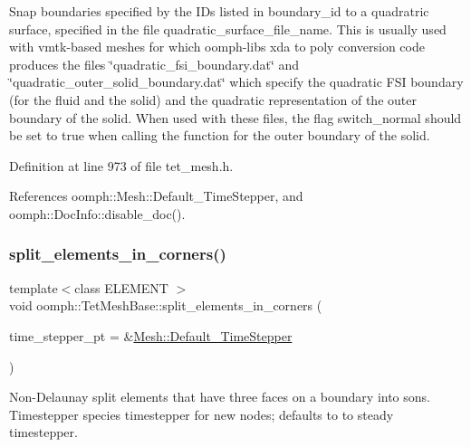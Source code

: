 Snap boundaries specified by the I\+Ds listed in boundary\+\_\+id to a quadratric surface, specified in the file quadratic\+\_\+surface\+\_\+file\+\_\+name. This is usually used with vmtk-\/based meshes for which oomph-\/lib\textquotesingle{}s xda to poly conversion code produces the files \char`\"{}quadratic\+\_\+fsi\+\_\+boundary.\+dat\char`\"{} and \char`\"{}quadratic\+\_\+outer\+\_\+solid\+\_\+boundary.\+dat\char`\"{} which specify the quadratic F\+SI boundary (for the fluid and the solid) and the quadratic representation of the outer boundary of the solid. When used with these files, the flag switch\+\_\+normal should be set to true when calling the function for the outer boundary of the solid. 



Definition at line 973 of file tet\+\_\+mesh.\+h.



References oomph\+::\+Mesh\+::\+Default\+\_\+\+Time\+Stepper, and oomph\+::\+Doc\+Info\+::disable\+\_\+doc().

\mbox{\label{classoomph_1_1TetMeshBase_ae4d5a602fb4a4c6a4ee2fe2a027d0ef6}} 
\subsubsection{\texorpdfstring{split\+\_\+elements\+\_\+in\+\_\+corners()}{split\_elements\_in\_corners()}}
{\footnotesize\ttfamily template$<$class E\+L\+E\+M\+E\+NT $>$ \\
void oomph\+::\+Tet\+Mesh\+Base\+::split\+\_\+elements\+\_\+in\+\_\+corners (\begin{DoxyParamCaption}\item[{\hyperlink{classoomph_1_1TimeStepper}{Time\+Stepper} $\ast$}]{time\+\_\+stepper\+\_\+pt = {\ttfamily \&\hyperlink{classoomph_1_1Mesh_a12243d0fee2b1fcee729ee5a4777ea10}{Mesh\+::\+Default\+\_\+\+Time\+Stepper}} }\end{DoxyParamCaption})}



Non-\/\+Delaunay split elements that have three faces on a boundary into sons. Timestepper species timestepper for new nodes; defaults to to steady timestepper. 

